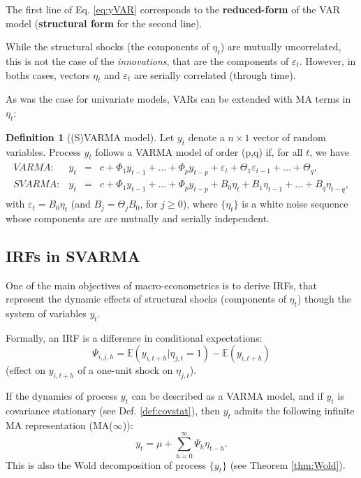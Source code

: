 \documentclass[
  12pt,
]{book}
\theoremstyle{definition}
\newtheorem{definition}{Definition}[chapter]
\theoremstyle{definition}
\theoremstyle{definition}
\theoremstyle{definition}
\theoremstyle{remark}
\begin{document}
The first line of Eq. \eqref{eq:yVAR} corresponds to the \textbf{reduced-form} of the VAR model (\textbf{structural form} for the second line).

While the structural shocks (the components of \(\eta_t\)) are mutually uncorrelated, this is not the case of the \emph{innovations}, that are the components of \(\varepsilon_t\). However, in boths cases, vectors \(\eta_t\) and \(\varepsilon_t\) are serially correlated (through time).

As was the case for univariate models, VARs can be extended with MA terms in \(\eta_t\):

\begin{definition}[(S)VARMA model]
\protect\hypertarget{def:SVARMA}{}\label{def:SVARMA}Let \(y_{t}\) denote a \(n \times1\) vector of random variables. Process \(y_{t}\) follows a VARMA model of order (p,q) if, for all \(t\), we have
\begin{eqnarray}
\begin{array}{rllll}
VARMA:& y_t &=& c + \Phi_1 y_{t-1} + \dots + \Phi_p y_{t-p} + \varepsilon_t + \Theta_1\varepsilon_{t-1} + \dots + \Theta_q ,\\
SVARMA:& y_t &=& c + \Phi_1 y_{t-1} + \dots + \Phi_p y_{t-p} + B_0 \eta_t+ B_1 \eta_{t-1} + \dots +  B_q \eta_{t-q},
\end{array}\label{eq:yVARMA}
\end{eqnarray}
with \(\varepsilon_t = B_0\eta_t\) (and \(B_j = \Theta_j B_0\), for \(j \ge 0\)), where \(\{\eta_{t}\}\) is a white noise sequence whose components are are mutually and serially independent.
\end{definition}

\hypertarget{IRFSVARMA}{%
\subsection{IRFs in SVARMA}\label{IRFSVARMA}}

One of the main objectives of macro-econometrics is to derive IRFs, that represent the dynamic effects of structural shocks (components of \(\eta_t\)) though the system of variables \(y_t\).

Formally, an IRF is a difference in conditional expectations:
\[
\boxed{\Psi_{i,j,h} = \mathbb{E}(y_{i,t+h}|\eta_{j,t}=1) - \mathbb{E}(y_{i,t+h})}
\]
(effect on \(y_{i,t+h}\) of a one-unit shock on \(\eta_{j,t}\)).

If the dynamics of process \(y_t\) can be described as a VARMA model, and if \(y_t\) is covariance stationary (see Def. \ref{def:covstat}), then \(y_t\) admits the following infinite MA representation (MA(\(\infty\))):
\begin{equation}
y_t = \mu + \sum_{h=0}^\infty \Psi_{h} \eta_{t-h}.\label{eq:InfMA}
\end{equation}
This is also the Wold decomposition of process \(\{y_t\}\) (see Theorem \ref{thm:Wold}).
\end{document}
